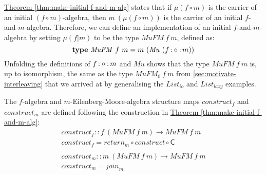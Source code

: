 \documentclass{jfp1}
\newcommand{\thmref}[1]{\hyperref[#1]{Theorem \ref*{#1}}}
\newcommand{\kw}[1]{\textbf{#1}}
\begin{document}
\thmref{thm:make-initial-f-and-m-alg} states that if $\mu(f \circ m)$
is the carrier of an initial $(f \circ m)$-algebra, then $m~(\mu(f
\circ m))$ is the carrier of an initial
$f$-and-$m$-algebra. Therefore, we can define an implementation of an
initial $f$-and-$m$-algebra by setting $\mu (f|m)$ to be the type
$\mathit{MuFM}~f~m$, defined as:
\begin{displaymath}
  \kw{type}~\mathit{MuFM}~f~m = m~(\mathit{Mu}~(f \fcompose m))
\end{displaymath}
Unfolding the definitions of $f \mathop{\mathord:\circ\mathord:} m$ and $\mathit{Mu}$ shows that
the type $\mathit{MuFM}~f~m$ is, up to isomorphism, the same as the
type $\mathit{MuFM_0}~f~m$ from \autoref{sec:motivate-interleaving}
that we arrived at by generalising the $\mathit{List_{io}}$ and
$\mathit{List_{lazy}}$ examples.

The $f$-algebra and $m$-Eilenberg-Moore-algebra structure maps
$\mathit{construct_f}$ and $\mathit{construct_m}$ are defined
following the construction in \thmref{thm:make-initial-f-and-m-alg}:
\begin{displaymath}
  \begin{array}{l}
    \mathit{construct}_f :: f~(\mathit{MuFM}~f~m) \to \mathit{MuFM}~f~m \\
    \mathit{construct}_f = \mathit{return}_m \circ \mathit{construct} \circ \mathsf{C} \\
    \\
    \mathit{construct}_m :: m~(\mathit{MuFM}~f~m) \to \mathit{MuFM}~f~m \\
    \mathit{construct}_m = \mathit{join}_m
  \end{array}
\end{displaymath}
\end{document}
